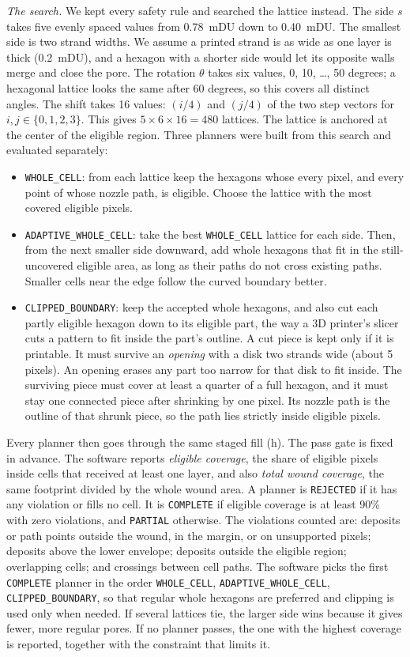 \documentclass[conference]{IEEEtran}
\begin{document}
\emph{The search.} We kept every safety rule and searched the lattice
instead. The side $s$ takes five evenly spaced values from 0.78~mDU down to
0.40~mDU. The smallest side is two strand widths. We assume a printed strand
is as wide as one layer is thick (0.2~mDU), and a hexagon with a shorter side
would let its opposite walls merge and close the pore. The rotation $\theta$
takes six values, 0, 10, \ldots, 50 degrees; a hexagonal lattice looks the
same after 60 degrees, so this covers all distinct angles. The shift takes 16
values: $(i/4)$ and $(j/4)$ of the two step vectors for
$i,j\in\{0,1,2,3\}$. This gives $5\times6\times16=480$ lattices. The lattice
is anchored at the center of the eligible region. Three planners were
built from this search and evaluated separately:
\begin{itemize}
\item \texttt{WHOLE\_CELL}: from each lattice keep the hexagons whose every
pixel, and every point of whose nozzle path, is eligible. Choose the lattice
with the most covered eligible pixels.
\item \texttt{ADAPTIVE\_WHOLE\_CELL}: take the best \texttt{WHOLE\_CELL}
lattice for each side. Then, from the next smaller side downward, add whole
hexagons that fit in the still-uncovered eligible area, as long as their
paths do not cross existing paths. Smaller cells near the edge follow the
curved boundary better.
\item \texttt{CLIPPED\_BOUNDARY}: keep the accepted whole hexagons, and also
cut each partly eligible hexagon down to its eligible part, the way a 3D
printer's slicer cuts a pattern to fit inside the part's outline. A cut
piece is kept only if it is printable. It must survive an
\emph{opening} with a disk two strands wide (about 5 pixels). An opening
erases any part too narrow for that disk to fit inside. The surviving piece
must cover at least a quarter of a full hexagon, and it must stay one
connected piece after shrinking by one pixel. Its nozzle path is the outline
of that shrunk piece, so the path lies strictly inside eligible pixels.
\end{itemize}
Every planner then goes through the same staged fill (h). The pass gate is
fixed in advance. The software reports \emph{eligible coverage}, the share of
eligible pixels inside cells that received at least one layer, and also
\emph{total wound coverage}, the same footprint divided by the whole wound
area. A planner is \texttt{REJECTED} if it has any violation or fills no
cell. It is \texttt{COMPLETE} if eligible coverage is at least 90\% with zero
violations, and \texttt{PARTIAL} otherwise. The violations counted are:
deposits or path points outside the wound, in the margin, or on
unsupported pixels; deposits above the lower envelope; deposits outside the
eligible region; overlapping cells; and crossings between cell paths.
The software picks the first \texttt{COMPLETE} planner in the order
\texttt{WHOLE\_CELL}, \texttt{ADAPTIVE\_WHOLE\_CELL},
\texttt{CLIPPED\_BOUNDARY}, so that regular whole hexagons are preferred and
clipping is used only when needed. If several lattices tie, the larger side
wins because it gives fewer, more regular pores. If no planner passes, the
one with the highest coverage is reported, together with the constraint that
limits it.
\end{document}
